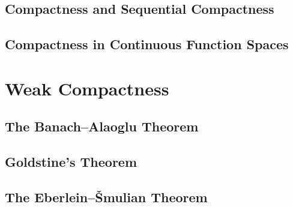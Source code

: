 \documentclass[10pt]{mypackage}
\begin{document}
\subsection{Compactness and Sequential Compactness}%
\subsection{Compactness in Continuous Function Spaces}%
\section{Weak Compactness}%
\subsection{The Banach--Alaoglu Theorem}%
\subsection{Goldstine's Theorem}%
\subsection{The Eberlein--\v{S}mulian Theorem}%
\end{document}
